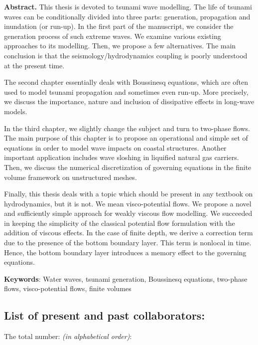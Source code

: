 \documentclass[final, a4paper, oneside, 12pt]{article}
\makeatletter
\newcounter{countitems}
\newcounter{nextitemizecount}
\newcommand{\nextitemizecount}{%
  \getrefnumber{countitems@\number\c@nextitemizecount}%
}
\numberwithin{equation}{section}
\makeatother
\begin{document}
\vspace{1em}

\textbf{Abstract.} This thesis is devoted to tsunami wave modelling. The life of tsunami waves can be conditionally divided into three parts: generation, propagation and inundation (or run-up). In the first part of the manuscript, we consider the generation process of such extreme waves. We examine various existing approaches to its modelling. Then, we propose a few alternatives. The main conclusion is that the seismology/hydrodynamics coupling is poorly understood at the present time.

The second chapter essentially deals with Boussinesq equations, which are often used to model tsunami propagation and sometimes even run-up. More precisely, we discuss the importance, nature and inclusion of dissipative effects in long-wave models.

In the third chapter, we slightly change the subject and turn to two-phase flows. The main purpose of this chapter is to propose an operational and simple set of equations in order to model wave impacts on coastal structures. Another important application includes wave sloshing in liquified natural gas carriers. Then, we discuss the numerical discretization of governing equations in the finite volume framework on unstructured meshes.

Finally, this thesis deals with a topic which should be present in any textbook on hydrodynamics, but it is not. We mean visco-potential flows. We propose a novel and sufficiently simple approach for weakly viscous flow modelling. We succeeded in keeping the simplicity of the classical potential flow formulation with the addition of viscous effects. In the case of finite depth, we derive a correction term due to the presence of the bottom boundary layer. This term is nonlocal in time. Hence, the bottom boundary layer introduces a memory effect to the governing equations.

\bigskip
\textbf{Keywords}: Water waves, tsunami generation, Boussinesq equations, two-phase flows, visco-potential flows, finite volumes


\subsection{List of present and past collaborators:}

The total number: \textbf{\nextitemizecount{}} \emph{(in alphabetical order)}:
\end{document}
